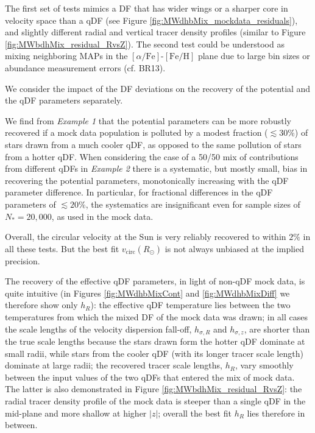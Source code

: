 \documentclass[iop,revtex4,numberedappendix,appendixfloats]{emulateapj}
\newcommand{\MAPs}{MAPs}
\begin{document}
The first set of tests mimics a DF that has wider wings or a sharper core in velocity space than a qDF (see Figure \ref{fig:MWdhbMix_mockdata_residuals}), and slightly different radial and vertical tracer density profiles (similar to Figure \ref{fig:MWbdhMix_residual_RvsZ}). The second test could be understood as mixing neighboring \MAPs{} in the $[\alpha/\mathrm{Fe}]$-$[\mathrm{Fe}/\mathrm{H}]$ plane due to large bin sizes or abundance measurement errors (cf. BR13). 

We consider the impact of the DF deviations on the recovery of the potential and the qDF parameters separately. 

We find from \emph{Example 1} that the potential parameters can be more robustly recovered if a mock data population is polluted by a modest fraction ($\lesssim 30\%$) of stars drawn from a much cooler qDF, as opposed to the same pollution of stars from a hotter qDF. When considering the case of a 50/50 mix of contributions from different qDFs in \emph{Example 2} there is a systematic, but mostly small, bias in recovering the potential parameters, monotonically increasing with the qDF parameter difference. In particular, for fractional differences in the qDF parameters of $\lesssim 20\%$, the systematics are insignificant even for sample sizes of $N_{*} = 20,000$, as used in the mock data.

Overall, the circular velocity at the Sun is very reliably recovered to within $2\%$ in all these tests. But the best fit $v_\text{circ}(R_\odot)$ is not always unbiased at the implied precision.


The recovery of the effective qDF parameters, in light of non-qDF mock data, is quite intuitive (in Figures \ref{fig:MWdhbMixCont} and \ref{fig:MWdhbMixDiff} we therefore show only $h_R$): the effective qDF temperature lies between the two temperatures from which the mixed DF of the mock data was drawn; in all cases the scale lengths of the velocity dispersion fall-off, $h_{\sigma,R}$ and $h_{\sigma,z}$, are shorter than the true scale lengths because the stars drawn form the hotter qDF dominate at small radii, while stars from the cooler qDF (with its longer tracer scale length) dominate at large radii; the recovered tracer scale lengths, $h_R$, vary smoothly between the input values of the two qDFs that entered the mix of mock data. The latter is also demonstrated in Figure \ref{fig:MWbdhMix_residual_RvsZ}: the radial tracer density profile of the mock data is steeper than a single qDF in the mid-plane and more shallow at higher $|z|$; overall the best fit $h_R$ lies therefore in between.
\end{document}
